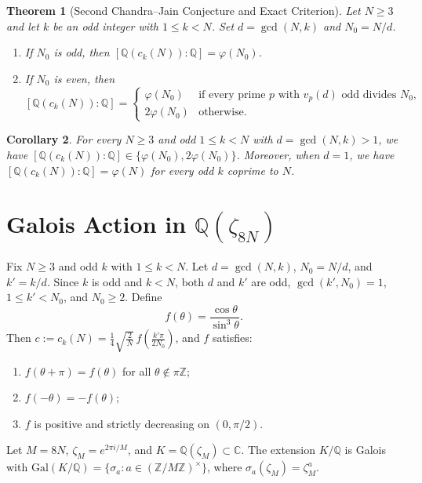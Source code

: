 \documentclass[11pt]{article}
\newtheorem{theorem}{Theorem}
\newtheorem{corollary}[theorem]{Corollary}
\begin{document}
\begin{theorem}[Second Chandra--Jain Conjecture and Exact Criterion]\label{thm:main}
Let $N \ge 3$ and let $k$ be an odd integer with $1 \le k < N$. Set $d = \gcd(N,k)$ and $N_0 = N/d$.
\begin{enumerate}
  \item If $N_0$ is odd, then $[\mathbb{Q}(c_k(N)) : \mathbb{Q}] = \varphi(N_0)$.
  \item If $N_0$ is even, then
  \[
  [\mathbb{Q}(c_k(N)) : \mathbb{Q}] =
  \begin{cases}
    \varphi(N_0) & \text{if every prime } p \text{ with } v_p(d) \text{ odd divides } N_0, \\
    2\varphi(N_0) & \text{otherwise.}
  \end{cases}
  \]
\end{enumerate}
\end{theorem}

\begin{corollary}
For every $N \ge 3$ and odd $1 \le k < N$ with $d = \gcd(N,k) > 1$, we have $[\mathbb{Q}(c_k(N)) : \mathbb{Q}] \in \{\varphi(N_0), 2\varphi(N_0)\}$. Moreover, when $d = 1$, we have $[\mathbb{Q}(c_k(N)) : \mathbb{Q}] = \varphi(N)$ for every odd $k$ coprime to $N$.
\end{corollary}

\section{Galois Action in \texorpdfstring{$\mathbb{Q}(\zeta_{8N})$}{Q(zeta\_8N)}}

Fix $N \ge 3$ and odd $k$ with $1 \le k < N$. Let $d = \gcd(N,k)$, $N_0 = N/d$, and $k' = k/d$. Since $k$ is odd and $k < N$, both $d$ and $k'$ are odd, $\gcd(k', N_0) = 1$, $1 \le k' < N_0$, and $N_0 \ge 2$. Define
\[
f(\theta) = \frac{\cos\theta}{\sin^3\theta}.
\]
Then $c := c_k(N) = \frac{1}{4}\sqrt{\frac{2}{N}}\,f\!\left(\frac{k'\pi}{2N_0}\right)$, and $f$ satisfies:
\begin{enumerate}
  \item[(F1)] $f(\theta + \pi) = f(\theta)$ for all $\theta \notin \pi\mathbb{Z}$;
  \item[(F2)] $f(-\theta) = -f(\theta)$;
  \item[(F3)] $f$ is positive and strictly decreasing on $(0, \pi/2)$.
\end{enumerate}

Let $M = 8N$, $\zeta_M = e^{2\pi i/M}$, and $K = \mathbb{Q}(\zeta_M) \subset \mathbb{C}$. The extension $K/\mathbb{Q}$ is Galois with $\mathrm{Gal}(K/\mathbb{Q}) = \{\sigma_a : a \in (\mathbb{Z}/M\mathbb{Z})^\times\}$, where $\sigma_a(\zeta_M) = \zeta_M^a$.
\end{document}

